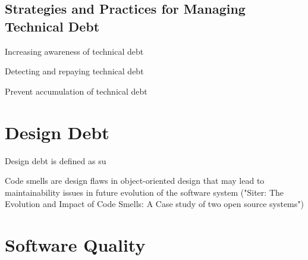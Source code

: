 

\subsection{Strategies and Practices for Managing Technical Debt}

Increasing awareness of technical debt

Detecting and repaying technical debt

Prevent accumulation of technical debt

























\section{Design Debt}
Design debt is defined as su

Code smells are design flaws in object-oriented design that may lead to maintainability issues in future evolution of the software system ("Siter: The Evolution and Impact of Code Smells: A Case study of two open source systems")












\section{Software Quality}






